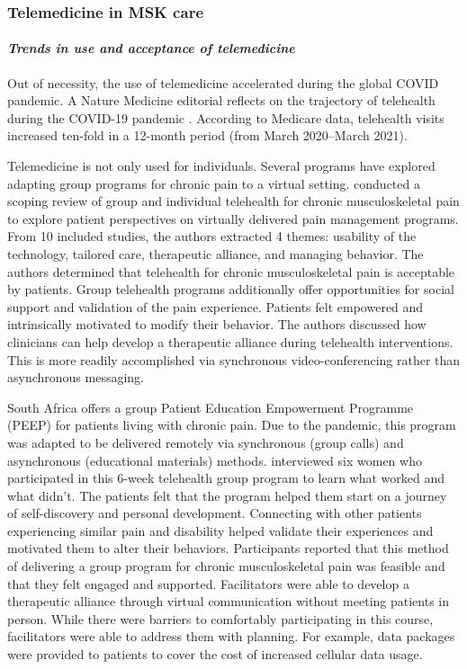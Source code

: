 \documentclass[utf8]{FrontiersinHarvard} %
\begin{document}
\subsubsection{Telemedicine in MSK care}

\paragraph{\textit{Trends in use and acceptance of telemedicine}}

Out of necessity, the use of telemedicine accelerated during the global COVID pandemic. A Nature Medicine editorial reflects on the trajectory of telehealth during the COVID-19 pandemic \citep{TelehealthHereStay2021}. According to Medicare data, telehealth visits increased ten-fold in a 12-month period (from March 2020--March 2021).

Telemedicine is not only used for individuals. Several programs have explored adapting group programs for chronic pain to a virtual setting. \citet{wallaceGroupIndividualTelehealth2022} conducted a scoping review of group and individual telehealth for chronic musculoskeletal pain to explore patient perspectives on virtually delivered pain management programs. From 10 included studies, the authors extracted 4 themes: usability of the technology, tailored care, therapeutic alliance, and managing behavior. The authors determined that telehealth for chronic musculoskeletal pain is acceptable by patients. Group telehealth programs additionally offer opportunities for social support and validation of the pain experience. Patients felt empowered and intrinsically motivated to modify their behavior. The authors discussed how clinicians can help develop a therapeutic alliance during telehealth interventions. This is more readily accomplished via synchronous video-conferencing rather than asynchronous messaging.

South Africa offers a group Patient Education Empowerment Programme (PEEP) for patients living with chronic pain. Due to the pandemic, this program was adapted to be delivered remotely via synchronous (group calls) and asynchronous (educational materials) methods. \citet{ernstzenYouMustUnderstand2022} interviewed six women who participated in this 6-week telehealth group program to learn what worked and what didn't. The patients felt that the program helped them start on a journey of self-discovery and personal development. Connecting with other patients experiencing similar pain and disability helped validate their experiences and motivated them to alter their behaviors. Participants reported that this method of delivering a group program for chronic musculoskeletal pain was feasible and that they felt engaged and supported. Facilitators were able to develop a therapeutic alliance through virtual communication without meeting patients in person. While there were barriers to comfortably participating in this course, facilitators were able to address them with planning. For example, data packages were provided to patients to cover the cost of increased cellular data usage.
\end{document}
